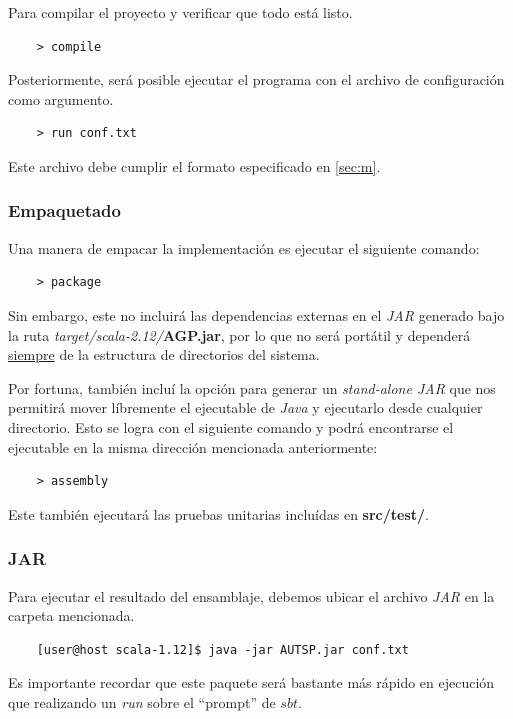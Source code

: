 \documentclass[12pt]{article}
\begin{document}
Para compilar el proyecto y verificar que todo está listo.
\begin{verbatim}
    > compile
\end{verbatim}
Posteriormente, será posible ejecutar el programa con el archivo de configuración como argumento.
\begin{verbatim}
    > run conf.txt
\end{verbatim}
Este archivo debe cumplir el formato especificado en \ref{sec:m}.
\subsubsection*{Empaquetado}
Una manera de empacar la implementación es ejecutar el siguiente comando:
\begin{verbatim}
    > package
\end{verbatim}
Sin embargo, este no incluirá las dependencias externas en el \textit{JAR} generado bajo la ruta \textit{target/scala-2.12/}\textbf{AGP.jar}, por lo que no será portátil y dependerá \underline{siempre} de la estructura de directorios del sistema.

Por fortuna, también incluí la opción para generar un \textit{stand-alone JAR} que nos permitirá mover líbremente el ejecutable de \textit{Java} y ejecutarlo desde cualquier directorio. Esto se logra con el
siguiente comando y podrá encontrarse el ejecutable en la misma dirección mencionada anteriormente:
\begin{verbatim}
    > assembly
\end{verbatim}
Este también ejecutará las pruebas unitarias incluídas en \textbf{src/test/}.

\subsubsection*{JAR}
Para ejecutar el resultado del ensamblaje, debemos ubicar el archivo \textit{JAR} en la carpeta mencionada.
\begin{verbatim}
    [user@host scala-1.12]$ java -jar AUTSP.jar conf.txt
\end{verbatim}
Es importante recordar que este paquete será bastante más rápido en ejecución que realizando un \textit{run} sobre el ``prompt'' de $sbt$.
\end{document}
